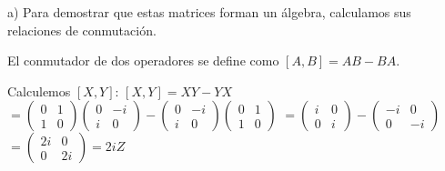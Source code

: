 \begin{questions}

  \begin{solution}
    a) Para demostrar que estas matrices forman un álgebra, calculamos sus relaciones de conmutación.

    El conmutador de dos operadores se define como $[A,B] = AB - BA$.

    Calculemos $[X,Y]$:
    $[X,Y] = XY - YX$
    $= \begin{pmatrix} 0 & 1 \\ 1 & 0 \end{pmatrix} \begin{pmatrix} 0 & -i \\ i & 0 \end{pmatrix} - \begin{pmatrix} 0 & -i \\ i & 0 \end{pmatrix} \begin{pmatrix} 0 & 1 \\ 1 & 0 \end{pmatrix}$
    $= \begin{pmatrix} i & 0 \\ 0 & i \end{pmatrix} - \begin{pmatrix} -i & 0 \\ 0 & -i \end{pmatrix}$
    $= \begin{pmatrix} 2i & 0 \\ 0 & 2i \end{pmatrix} = 2iZ$


\end{solution}
\end{questions}
